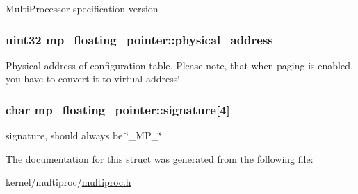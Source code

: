 \label{structmp__floating__pointer_a82fa98b3895b4442d2fb20710b652613}
MultiProcessor specification version \hypertarget{structmp__floating__pointer_aa3d9d8256dbd774b7c2dd6c18ad310e3}{
\subsubsection[{physical\_\-address}]{\setlength{\rightskip}{0pt plus 5cm}uint32 {\bf mp\_\-floating\_\-pointer::physical\_\-address}}}
\label{structmp__floating__pointer_aa3d9d8256dbd774b7c2dd6c18ad310e3}
Physical address of configuration table. Please note, that when paging is enabled, you have to convert it to virtual address! \hypertarget{structmp__floating__pointer_a7a7d6817d70f64be4bfd36433f70aafa}{
\subsubsection[{signature}]{\setlength{\rightskip}{0pt plus 5cm}char {\bf mp\_\-floating\_\-pointer::signature}\mbox{[}4\mbox{]}}}
\label{structmp__floating__pointer_a7a7d6817d70f64be4bfd36433f70aafa}
signature, should always be \char`\"{}\_\-MP\_\-\char`\"{} 

The documentation for this struct was generated from the following file:\begin{DoxyCompactItemize}
\item 
kernel/multiproc/\hyperlink{multiproc_8h}{multiproc.h}\end{DoxyCompactItemize}
